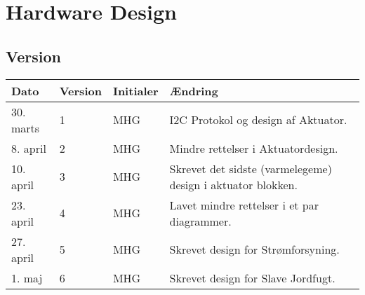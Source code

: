 
\chapter{Hardware Design} \label{ch:HwDesign}

\section{Version}
\begin{table}[h]
	\centering
	\begin{tabularx}{\textwidth - 2cm}{|l|l|l|X|}
	\hline
	Dato	& Version	& Initialer & Ændring	\\ \hline
	30. marts & 1 & MHG & I2C Protokol og design af Aktuator. \\ \hline
	8. april & 2 & MHG & Mindre rettelser i Aktuatordesign. \\ \hline
	10. april & 3 & MHG & Skrevet det sidste (varmelegeme) design i aktuator blokken. \\\hline 
	23. april & 4 & MHG & Lavet mindre rettelser i et par diagrammer. \\\hline
	27. april & 5 & MHG & Skrevet design for Strømforsyning. \\\hline
	1. maj & 6 & MHG & Skrevet design for Slave Jordfugt. \\\hline
	\end{tabularx}
\end{table}



	


